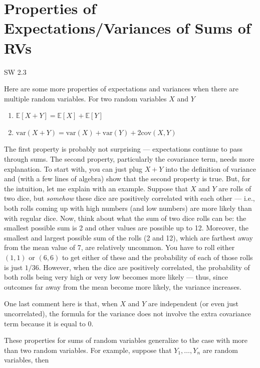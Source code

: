 \documentclass[
  letterpaper,
  DIV=11,
  numbers=noendperiod]{scrreprt}
\begin{document}
\section{Properties of Expectations/Variances of Sums of
RVs}\label{properties-of-expectationsvariances-of-sums-of-rvs}

SW 2.3

Here are some more properties of expectations and variances when there
are multiple random variables. For two random variables \(X\) and \(Y\)

\begin{enumerate}
\def\labelenumi{\arabic{enumi}.}
\item
  \(\mathbb{E}[X+Y] = \mathbb{E}[X] + \mathbb{E}[Y]\)
\item
  \(\mathrm{var}(X+Y) = \mathrm{var}(X) + \mathrm{var}(Y) + 2\mathrm{cov}(X,Y)\)
\end{enumerate}

The first property is probably not surprising --- expectations continue
to pass through sums. The second property, particularly the covariance
term, needs more explanation. To start with, you can just plug \(X+Y\)
into the definition of variance and (with a few lines of algebra) show
that the second property is true. But, for the intuition, let me explain
with an example. Suppose that \(X\) and \(Y\) are rolls of two dice, but
\emph{somehow} these dice are positively correlated with each other ---
i.e., both rolls coming up with high numbers (and low numbers) are more
likely than with regular dice. Now, think about what the sum of two dice
rolls can be: the smallest possible sum is 2 and other values are
possible up to 12. Moreover, the smallest and largest possible sum of
the rolls (2 and 12), which are farthest away from the mean value of 7,
are relatively uncommon. You have to roll either \((1,1)\) or \((6,6)\)
to get either of these and the probability of each of those rolls is
just \(1/36\). However, when the dice are positively correlated, the
probability of both rolls being very high or very low becomes more
likely --- thus, since outcomes far away from the mean become more
likely, the variance increases.

One last comment here is that, when \(X\) and \(Y\) are independent (or
even just uncorrelated), the formula for the variance does not involve
the extra covariance term because it is equal to 0.

These properties for sums of random variables generalize to the case
with more than two random variables. For example, suppose that
\(Y_1, \ldots, Y_n\) are random variables, then
\end{document}
